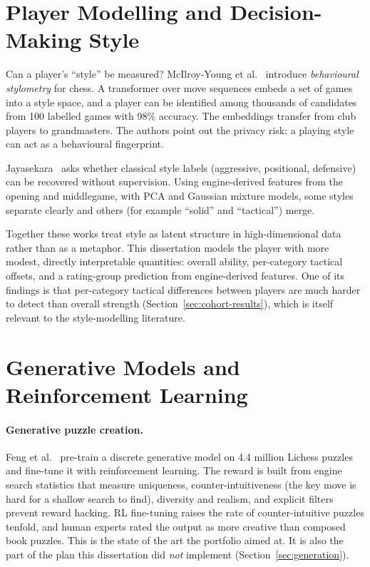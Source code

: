 \section{Player Modelling and Decision-Making Style}

Can a player's ``style'' be measured? McIlroy-Young et al.~\cite{mcilroyyoung2021detecting} introduce
\emph{behavioural stylometry} for chess. A transformer over move sequences embeds a set of games
into a style space, and a player can be identified among thousands of candidates from 100 labelled
games with 98\% accuracy. The embeddings transfer from club players to grandmasters. The authors
point out the privacy risk: a playing style can act as a behavioural fingerprint.

Jayasekara~\cite{jayasekara2018classification} asks whether classical style labels (aggressive,
positional, defensive) can be recovered without supervision. Using engine-derived features from the
opening and middlegame, with PCA and Gaussian mixture models, some styles separate clearly and others
(for example ``solid'' and ``tactical'') merge.

Together these works treat style as latent structure in high-dimensional data rather than as a
metaphor. This dissertation models the player with more modest, directly interpretable quantities:
overall ability, per-category tactical offsets, and a rating-group prediction from engine-derived
features. One of its findings is that per-category tactical differences between players are much
harder to detect than overall strength (Section~\ref{sec:cohort-results}), which is itself relevant
to the style-modelling literature.

\section{Generative Models and Reinforcement Learning}

\paragraph{Generative puzzle creation.} Feng et al.~\cite{feng2025generating} pre-train a discrete
generative model on 4.4 million Lichess puzzles and fine-tune it with reinforcement learning. The
reward is built from engine search statistics that measure uniqueness, counter-intuitiveness (the
key move is hard for a shallow search to find), diversity and realism, and explicit filters prevent
reward hacking. RL fine-tuning raises the rate of counter-intuitive puzzles tenfold, and human
experts rated the output as more creative than composed book puzzles. This is the state of the art
the portfolio aimed at. It is also the part of the plan this dissertation did \emph{not} implement
(Section~\ref{sec:generation}).


